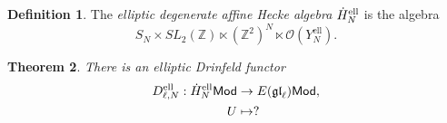 \documentclass[11pt]{report}
\newtheorem{theorem}{Theorem}[section]
\newtheorem{prop}[theorem]{Proposition}
\theoremstyle{definition}
\newtheorem{definition}[theorem]{Definition}
\theoremstyle{remark}
\theoremstyle{remark}
\newcommand{\Z}{\mathbb{Z}}
\begin{document}
%
%

\begin{definition}
The \emph{elliptic degenerate affine Hecke algebra} $\dot H_N^\textnormal{ell}$ is the algebra
\begin{equation*}
S_N \times SL_2(\Z) \ltimes (\Z^2)^N \ltimes \mathcal{O}(Y_N^\text{ell}).
\end{equation*}
\end{definition}

\begin{theorem}
There is an elliptic Drinfeld functor
\begin{align*}
D_{\ell,N}^\textnormal{ell}: \dot H_N^\textnormal{ell} \mathsf{Mod} &\to E(\mathfrak{gl}_\ell)\mathsf{Mod}, \\
U &\mapsto ?
\end{align*}
\end{theorem}
\end{document}
